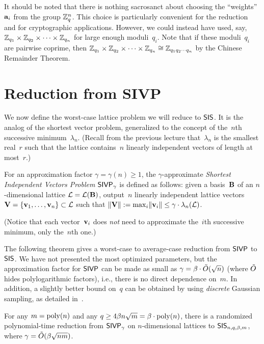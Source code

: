 \documentclass[11pt]{article}
\begin{document}
It should be noted that there is nothing sacrosanct about choosing the
``weights''~$\mathbf{a}_{i}$ from the group $\mathbb{Z}_q^{n}$. This choice is
particularly convenient for the reduction and for cryptographic
applications. However, we could instead have used, say,
$\mathbb{Z}_{q_1} \times \mathbb{Z}_{q_2} \times \cdots \times \mathbb{Z}_{q_n}$ for large
enough moduli~$q_i$. Note that if these moduli~$q_i$ are pairwise
coprime, then
$\mathbb{Z}_{q_1} \times \mathbb{Z}_{q_2} \times \cdots \times \mathbb{Z}_{q_n} \cong \mathbb{Z}_{q_1
  q_2 \cdots q_n}$ by the Chinese Remainder Theorem.

\section{Reduction from SIVP}
\label{sec:reduction-from-sivp}

We now define the worst-case lattice problem we will reduce to $\mathsf{SIS}$.
It is the analog of the shortest vector problem, generalized to the
concept of the~$n$th successive minimum~$\lambda_{n}$. (Recall from
the previous lecture that~$\lambda_{n}$ is the smallest real~$r$ such
that the lattice contains~$n$ linearly independent vectors of length
at most~$r$.)

\begin{definition}
  \label{def:sivp}
  For an approximation factor $\gamma = \gamma(n) \geq 1$, the
  $\gamma$-approximate \emph{Shortest Independent Vectors Problem}
  $\mathsf{SIVP}_{\gamma}$ is defined as follows: given a basis~$\mathbf{B}$ of an
  $n$-dimensional lattice $\mathcal{L} = \mathcal{L}(\mathbf{B})$, output~$n$ linearly
  independent lattice vectors
  $\mathbf{V} = \{\mathbf{v}_{1}, \ldots, \mathbf{v}_{n}\} \subset \mathcal{L}$ such that
  $\lVert\mathbf{V}\rVert := \max_{i} \lVert\mathbf{v}_{i}\rVert \leq \gamma \cdot
  \lambda_{n}(\mathcal{L})$.
\end{definition}
(Notice that each vector~$\mathbf{v}_{i}$ does \emph{not} need to
approximate the~$i$th successive minimum, only the~$n$th one.)

The following theorem gives a worst-case to average-case reduction
from $\mathsf{SIVP}$ to $\mathsf{SIS}$. We have not presented the most optimized
parameters, but the approximation factor for $\mathsf{SIVP}$ can be made as
small as $\gamma = \beta \cdot \tilde{O}(\sqrt{n})$ (where $\tilde{O}$ hides
polylogarithmic factors), i.e., there is no direct dependence on~$m$.
In addition, a slightly better bound on~$q$ can be obtained by using
\emph{discrete} Gaussian sampling, as detailed
in~\cite{DBLP:conf/stoc/GentryPV08}.

\begin{theorem}
  \label{thm:sivp-to-sis}
  For any $m=\operatorname{poly}(n)$ and any
  $q \geq 4 \beta n \sqrt{m} = \beta \cdot \operatorname{poly}(n)$, there is a
  randomized polynomial-time reduction from $\mathsf{SIVP}_{\gamma}$ on
  $n$-dimensional lattices to $\mathsf{SIS}_{n,q,\beta,m}$, where
  $\gamma = \tilde{O}(\beta \sqrt{n m})$.
\end{theorem}
\end{document}

